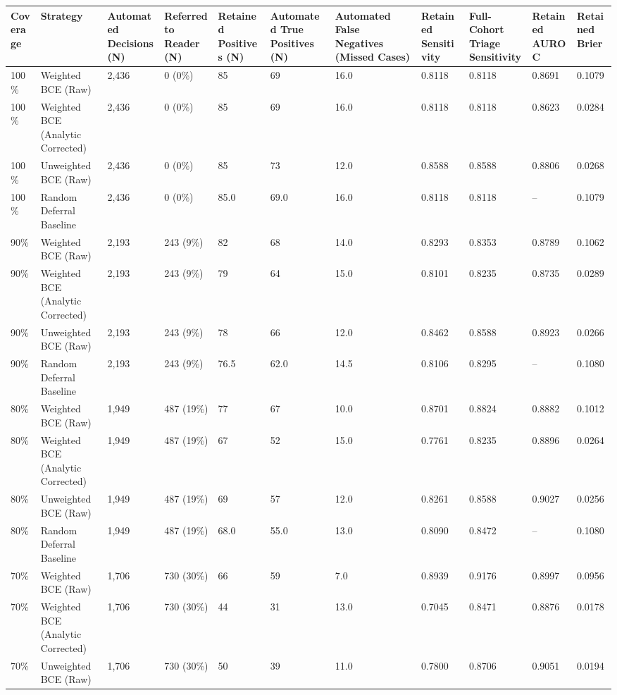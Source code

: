 \begin{tabular}{lllllllllll}
\toprule
Coverage & Strategy & Automated Decisions (N) & Referred to Reader (N) & Retained Positives (N) & Automated True Positives (N) & Automated False Negatives (Missed Cases) & Retained Sensitivity & Full-Cohort Triage Sensitivity & Retained AUROC & Retained Brier \\
\midrule
100\% & Weighted BCE (Raw) & 2,436 & 0 (0\%) & 85 & 69 & 16.0 & 0.8118 & 0.8118 & 0.8691 & 0.1079 \\
100\% & Weighted BCE (Analytic Corrected) & 2,436 & 0 (0\%) & 85 & 69 & 16.0 & 0.8118 & 0.8118 & 0.8623 & 0.0284 \\
100\% & Unweighted BCE (Raw) & 2,436 & 0 (0\%) & 85 & 73 & 12.0 & 0.8588 & 0.8588 & 0.8806 & 0.0268 \\
100\% & Random Deferral Baseline & 2,436 & 0 (0\%) & 85.0 & 69.0 & 16.0 & 0.8118 & 0.8118 & -- & 0.1079 \\
90\% & Weighted BCE (Raw) & 2,193 & 243 (9\%) & 82 & 68 & 14.0 & 0.8293 & 0.8353 & 0.8789 & 0.1062 \\
90\% & Weighted BCE (Analytic Corrected) & 2,193 & 243 (9\%) & 79 & 64 & 15.0 & 0.8101 & 0.8235 & 0.8735 & 0.0289 \\
90\% & Unweighted BCE (Raw) & 2,193 & 243 (9\%) & 78 & 66 & 12.0 & 0.8462 & 0.8588 & 0.8923 & 0.0266 \\
90\% & Random Deferral Baseline & 2,193 & 243 (9\%) & 76.5 & 62.0 & 14.5 & 0.8106 & 0.8295 & -- & 0.1080 \\
80\% & Weighted BCE (Raw) & 1,949 & 487 (19\%) & 77 & 67 & 10.0 & 0.8701 & 0.8824 & 0.8882 & 0.1012 \\
80\% & Weighted BCE (Analytic Corrected) & 1,949 & 487 (19\%) & 67 & 52 & 15.0 & 0.7761 & 0.8235 & 0.8896 & 0.0264 \\
80\% & Unweighted BCE (Raw) & 1,949 & 487 (19\%) & 69 & 57 & 12.0 & 0.8261 & 0.8588 & 0.9027 & 0.0256 \\
80\% & Random Deferral Baseline & 1,949 & 487 (19\%) & 68.0 & 55.0 & 13.0 & 0.8090 & 0.8472 & -- & 0.1080 \\
70\% & Weighted BCE (Raw) & 1,706 & 730 (30\%) & 66 & 59 & 7.0 & 0.8939 & 0.9176 & 0.8997 & 0.0956 \\
70\% & Weighted BCE (Analytic Corrected) & 1,706 & 730 (30\%) & 44 & 31 & 13.0 & 0.7045 & 0.8471 & 0.8876 & 0.0178 \\
70\% & Unweighted BCE (Raw) & 1,706 & 730 (30\%) & 50 & 39 & 11.0 & 0.7800 & 0.8706 & 0.9051 & 0.0194 \\

\end{tabular}

